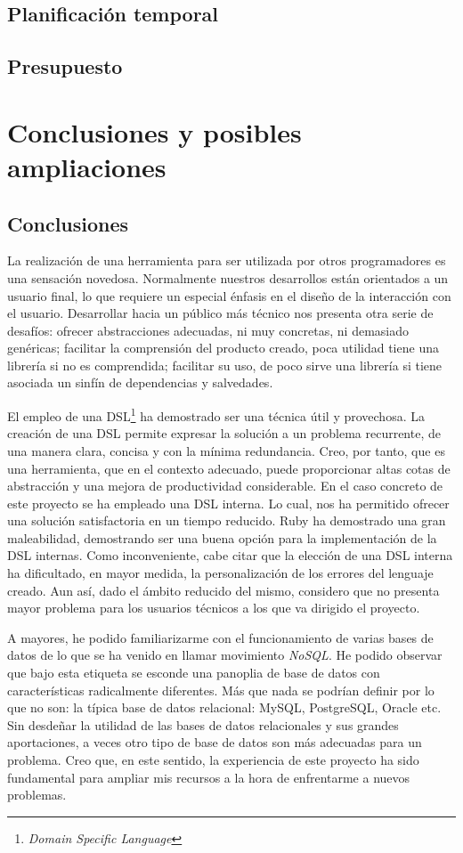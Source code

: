 \subsection{Planificación temporal}
\subsection{Presupuesto}

\section{Conclusiones y posibles ampliaciones}

\subsection{Conclusiones}

La realización de una herramienta para ser utilizada por otros
programadores es una sensación novedosa. Normalmente nuestros
desarrollos están orientados a un usuario final, lo que requiere un
especial énfasis en el diseño de la interacción con el usuario.
Desarrollar hacia un público más técnico nos presenta otra serie de
desafíos: ofrecer abstracciones adecuadas, ni muy concretas, ni
demasiado genéricas; facilitar la comprensión del producto creado,
poca utilidad tiene una librería si no es comprendida; facilitar su
uso, de poco sirve una librería si tiene asociada un sinfín de
dependencias y salvedades.

El empleo de una DSL\footnote{\emph{Domain Specific Language}} ha
demostrado ser una técnica útil y provechosa. La creación de una DSL
permite expresar la solución a un problema recurrente, de una manera
clara, concisa y con la mínima redundancia. Creo, por tanto, que es
una herramienta, que en el contexto adecuado, puede proporcionar altas
cotas de abstracción y una mejora de productividad considerable. En el
caso concreto de este proyecto se ha empleado una DSL interna. Lo
cual, nos ha permitido ofrecer una solución satisfactoria en un tiempo
reducido. Ruby ha demostrado una gran maleabilidad, demostrando ser
una buena opción para la implementación de la DSL internas. Como
inconveniente, cabe citar que la elección de una DSL interna ha
dificultado, en mayor medida, la personalización de los errores del
lenguaje creado. Aun así, dado el ámbito reducido del mismo, considero
que no presenta mayor problema para los usuarios técnicos a los que va
dirigido el proyecto.

A mayores, he podido familiarizarme con el funcionamiento de varias
bases de datos de lo que se ha venido en llamar movimiento
\emph{NoSQL}. He podido observar que bajo esta etiqueta se esconde
una panoplia de base de datos con características radicalmente
diferentes. Más que nada se podrían definir por lo que no son: la
típica base de datos relacional: MySQL, PostgreSQL, Oracle etc.
Sin desdeñar la utilidad de las bases de datos relacionales y sus
grandes aportaciones, a veces otro tipo de base de datos son más
adecuadas para un problema. Creo que, en este sentido, la experiencia
de este proyecto ha sido fundamental para ampliar mis recursos a la
hora de enfrentarme a nuevos problemas.

